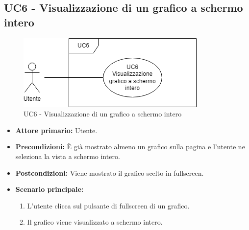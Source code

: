 \subsection{UC6 - Visualizzazione di un grafico a schermo intero}
\begin{figure}[h!]
	\centering
	\includegraphics[scale=0.55]{../../assets/visualizzazione_fullscreen.png}
	\caption{UC6 - Visualizzazione di un grafico a schermo intero}
\end{figure}

\begin{itemize}
	\item \textbf{Attore primario:} Utente.
	\item \textbf{Precondizioni:} È già mostrato almeno un grafico sulla pagina e l'utente ne seleziona la vista a schermo intero. 
	\item \textbf{Postcondizioni:} 
	Viene mostrato il grafico scelto in fullscreen.
	\item \textbf{Scenario principale:}
		\begin{enumerate}
			\item L'utente clicca sul pulsante di fullscreen di un grafico.
			\item Il grafico viene visualizzato a schermo intero.
		\end{enumerate}
\end{itemize}
\newpage


